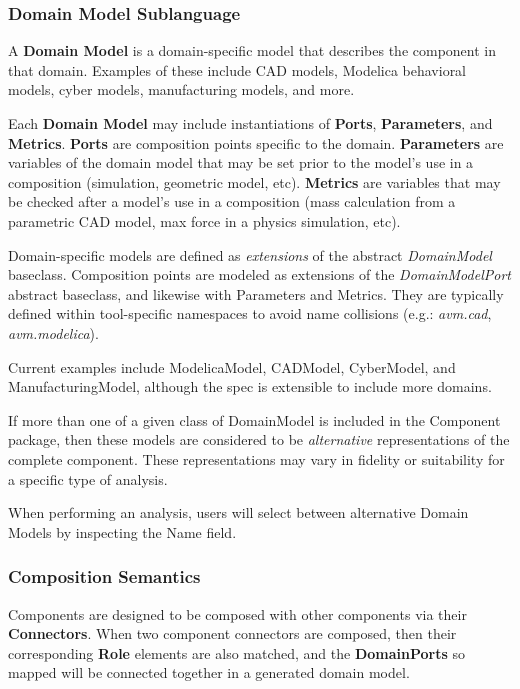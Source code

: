 \subsubsection{Domain Model Sublanguage}
A \textbf{Domain Model} is a domain-specific model that describes the component in that domain. Examples of these include CAD models, Modelica behavioral models, cyber models, manufacturing models, and more.

Each \textbf{Domain Model} may include instantiations of \textbf{Ports}, \textbf{Parameters}, and \textbf{Metrics}. \textbf{Ports} are composition points specific to the domain. \textbf{Parameters} are variables of the domain model that may be set prior to the model's use in a composition (simulation, geometric model, etc). \textbf{Metrics} are variables that may be checked after a model's use in a composition (mass calculation from a parametric CAD model, max force in a physics simulation, etc).

Domain-specific models are defined as \textit{extensions} of the abstract \textit{DomainModel} baseclass. Composition points are modeled as extensions of the \textit{DomainModelPort} abstract baseclass, and likewise with Parameters and Metrics. They are typically defined within tool-specific namespaces to avoid name collisions (e.g.: \textit{avm.cad}, \textit{avm.modelica}).

Current examples include ModelicaModel, CADModel, CyberModel, and ManufacturingModel, although the spec is extensible to include more domains.

\label{Domain_Model_Alternatives}
If more than one of a given class of DomainModel is included in the Component package, then these models are considered to be \textit{alternative} representations of the complete component. These representations may vary in fidelity or suitability for a specific type of analysis.

When performing an analysis, users will select between alternative Domain Models by inspecting the Name field.

\subsubsection{Composition Semantics}
\label{Composition_Semantics}
Components are designed to be composed with other components via their \textbf{Connectors}. When two component connectors are composed, then their corresponding \textbf{Role} elements are also matched, and the \textbf{DomainPorts} so mapped will be connected together in a generated domain model.

